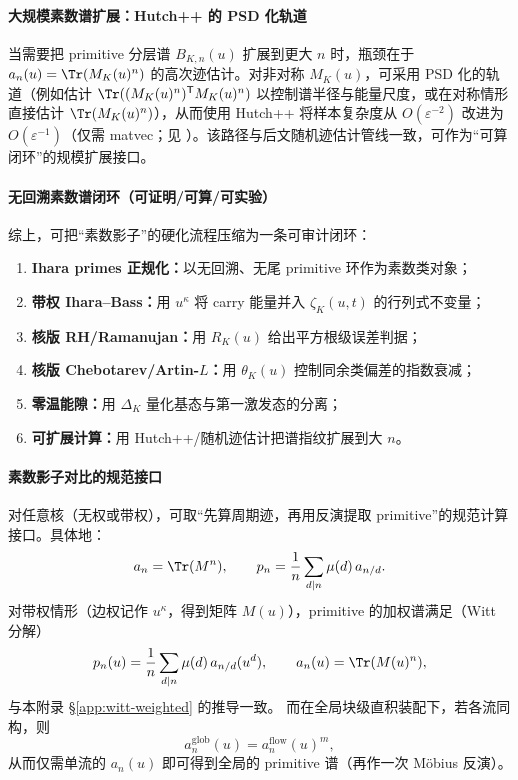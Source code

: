 \paragraph{大规模素数谱扩展：Hutch++ 的 PSD 化轨道}
当需要把 primitive 分层谱 $B_{K,n}(u)$ 扩展到更大 $n$ 时，瓶颈在于 $a_n(u)=\Tr(M_K(u)^n)$ 的高次迹估计。对非对称 $M_K(u)$，可采用 PSD 化的轨道（例如估计 $\Tr((M_K(u)^n)^{\mathsf T}M_K(u)^n)$ 以控制谱半径与能量尺度，或在对称情形直接估计 $\Tr(M_K(u)^n)$），从而使用 Hutch++ 将样本复杂度从 $O(\varepsilon^{-2})$ 改进为 $O(\varepsilon^{-1})$（仅需 matvec；见 \cite{MeyerMuscoMuscoWoodruff2021Hutchpp}）。该路径与后文随机迹估计管线一致，可作为“可算闭环”的规模扩展接口。

\paragraph{无回溯素数谱闭环（可证明/可算/可实验）}
综上，可把“素数影子”的硬化流程压缩为一条可审计闭环：
\begin{enumerate}
  \item \textbf{Ihara primes 正规化：}以无回溯、无尾 primitive 环作为素数类对象；
  \item \textbf{带权 Ihara--Bass：}用 $u^{\kappa}$ 将 carry 能量并入 $\zeta_K(u,t)$ 的行列式不变量；
  \item \textbf{核版 RH/Ramanujan：}用 $R_K(u)$ 给出平方根级误差判据；
  \item \textbf{核版 Chebotarev/Artin-$L$：}用 $\theta_K(u)$ 控制同余类偏差的指数衰减；
  \item \textbf{零温能隙：}用 $\Delta_K$ 量化基态与第一激发态的分离；
  \item \textbf{可扩展计算：}用 Hutch++/随机迹估计把谱指纹扩展到大 $n$。
\end{enumerate}

\paragraph{素数影子对比的规范接口}
对任意核（无权或带权），可取“先算周期迹，再用反演提取 primitive”的规范计算接口。具体地：
\[
a_n=\Tr(M^n),\qquad
p_n=\frac{1}{n}\sum_{d\mid n}\mu(d)\,a_{n/d}.
\]
对带权情形（边权记作 $u^{\kappa}$，得到矩阵 $M(u)$），primitive 的加权谱满足（Witt 分解）
\[
p_n(u)=\frac{1}{n}\sum_{d\mid n}\mu(d)\,a_{n/d}(u^d),
\qquad a_n(u)=\Tr(M(u)^n),
\]
与本附录 \S\ref{app:witt-weighted} 的推导一致。
而在全局块级直积装配下，若各流同构，则
\[
a_n^{\mathrm{glob}}(u)=a_n^{\mathrm{flow}}(u)^m,
\]
从而仅需单流的 $a_n(u)$ 即可得到全局的 primitive 谱（再作一次 Möbius 反演）。

